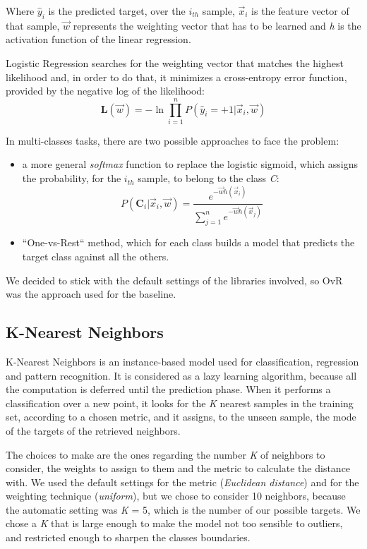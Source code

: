 Where $ \hat{y}_{i} $ is the predicted target, over the  \textit{$i_{th}$} sample, \textit{$ \vec{x}_{i} $} is the feature vector of that sample, \textit{$ \vec{w} $} represents the weighting vector that has to be learned and \textit{h} is the activation function of the linear regression.

Logistic Regression searches for the weighting vector that matches the highest likelihood and, in order to do that, it minimizes a cross-entropy
error function, provided by the negative log of the likelihood:
\[{ \mathbf{L}(\vec{w}) = -\ln \prod\limits_{i=1}^{n} P(\hat{y}_{i} = +1 | \vec{x}_{i}, \vec{w})}\]

In multi-classes tasks, there are two possible approaches to face the problem:
\begin{itemize}
	\item[\PencilRight] a more general \textit{softmax} function to replace the logistic sigmoid, which assigns the probability, for the  \textit{$i_{th}$} sample, to belong to the class \textit{C}:
	\[{\displaystyle P(\mathbf{C}_{i} | \vec{x}_{i}, \vec{w})={\frac {e^{-\vec{w}h(\vec{x}_{i})}}{\sum\limits_{j = 1}^{n}e^{-\vec{w}h(\vec{x}_{j})}}}}\]
	\item[\PencilRight] ``One-vs-Rest`` method, which for each class builds a model that predicts the target class against all the others.
\end{itemize}
We decided to stick with the default settings of the libraries involved, so OvR was the approach used for the baseline.

\subsection{K-Nearest Neighbors}
K-Nearest Neighbors is an instance-based model used for classification, regression and pattern recognition. It is considered as a lazy learning algorithm, because all the computation is deferred until the prediction phase.
When it performs a classification over a new point, it looks for the \textit{K} nearest samples in the training set, according to a chosen metric, and it assigns, to the unseen sample, the mode of the targets of the retrieved neighbors.

The choices to make are the ones regarding the number \textit{K} of neighbors to consider, the weights to assign to them and the metric to calculate the distance with.
We used the default settings for the metric (\textit{Euclidean distance}) and for the weighting technique (\textit{uniform}), but we chose to consider 10 neighbors, because the automatic setting was \textit{K} = 5, which is the number of our possible targets.
We chose a \textit{K} that is large enough to make the model not too sensible to outliers, and restricted enough to sharpen the classes boundaries.

